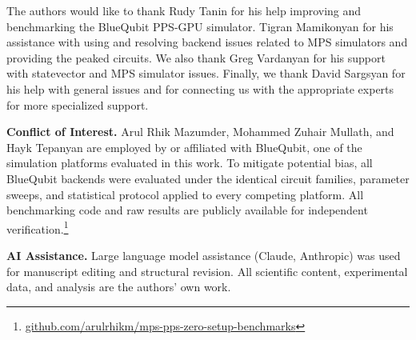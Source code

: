 \documentclass[conference,10pt]{IEEEtran}
\newcommand{\repo}{\href{https://github.com/arulrhikm/mps-pps-zero-setup-benchmarks}{github.com/arulrhikm/mps-pps-zero-setup-benchmarks}}
\begin{document}
The authors would like to thank Rudy Tanin for his help improving and benchmarking the BlueQubit PPS-GPU simulator. Tigran Mamikonyan for his assistance with using and resolving backend issues related to MPS simulators and providing the peaked circuits. We also thank Greg Vardanyan for his support with statevector and MPS simulator issues. Finally, we thank David Sargsyan for his help with general issues and for connecting us with the appropriate experts for more specialized support.

\textbf{Conflict of Interest.} Arul Rhik Mazumder, Mohammed Zuhair Mullath, and Hayk Tepanyan are employed by or affiliated with BlueQubit, one of the simulation platforms evaluated in this work. To mitigate potential bias, all BlueQubit backends were evaluated under the identical circuit families, parameter sweeps, and statistical protocol applied to every competing platform. All benchmarking code and raw results are publicly available for independent verification.\footnote{\repo}

\textbf{AI Assistance.} Large language model assistance (Claude, Anthropic) was used for manuscript editing and structural revision. All scientific content, experimental data, and analysis are the authors' own work.



\end{document}
